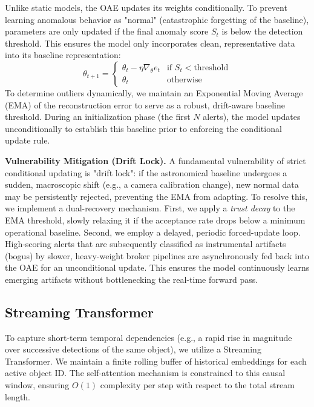 \documentclass[10pt,journal,compsoc]{IEEEtran}
\begin{document}
Unlike static models, the OAE updates its weights conditionally. To prevent learning anomalous behavior as "normal" (catastrophic forgetting of the baseline), parameters are only updated if the final anomaly score $S_t$ is below the detection threshold. This ensures the model only incorporates clean, representative data into its baseline representation:
\begin{equation}
    \theta_{t+1} = 
    \begin{cases} 
    \theta_t - \eta \nabla_\theta e_t & \text{if } S_t < \text{threshold} \\
    \theta_t & \text{otherwise}
    \end{cases}
\end{equation}
To determine outliers dynamically, we maintain an Exponential Moving Average (EMA) of the reconstruction error to serve as a robust, drift-aware baseline threshold. During an initialization phase (the first $N$ alerts), the model updates unconditionally to establish this baseline prior to enforcing the conditional update rule.

\textbf{Vulnerability Mitigation (Drift Lock).} A fundamental vulnerability of strict conditional updating is "drift lock": if the astronomical baseline undergoes a sudden, macroscopic shift (e.g., a camera calibration change), new normal data may be persistently rejected, preventing the EMA from adapting. To resolve this, we implement a dual-recovery mechanism. First, we apply a \textit{trust decay} to the EMA threshold, slowly relaxing it if the acceptance rate drops below a minimum operational baseline. Second, we employ a delayed, periodic forced-update loop. High-scoring alerts that are subsequently classified as instrumental artifacts (bogus) by slower, heavy-weight broker pipelines are asynchronously fed back into the OAE for an unconditional update. This ensures the model continuously learns emerging artifacts without bottlenecking the real-time forward pass.

\subsection{Streaming Transformer}
To capture short-term temporal dependencies (e.g., a rapid rise in magnitude over successive detections of the same object), we utilize a Streaming Transformer. We maintain a finite rolling buffer of historical embeddings for each active object ID. The self-attention mechanism is constrained to this causal window, ensuring $O(1)$ complexity per step with respect to the total stream length.
\end{document}

